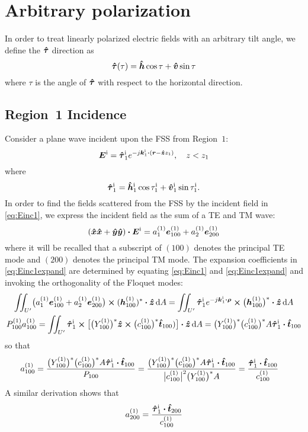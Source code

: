 \documentclass[11pt]{article}
\renewcommand{\inc}{^{\text{i}}}
\renewcommand{\abs}[1]{\bigl\lvert#1\bigr\rvert}
\begin{document}
\section{Arbitrary polarization}
In order to treat linearly polarized electric fields with an arbitrary
tilt angle, we define the $\tauhat$ direction as 
\begin{equation}
  \tauhat(\tau) = \hhat \cos \tau + \vhat \sin \tau
\end{equation}
where $\tau$ is the angle of $\tauhat$ with respect to the horizontal
direction. 

\subsection{Region~1 Incidence}

Consider a plane wave incident upon the FSS from Region~$1$:
\begin{equation}
  \E\inc = \tauhat_1\inc e^{-j\k_1\inc \bdot (\r - \z z_1)}, \quad z<z_1
  \label{eq:Einc1}
\end{equation}
where
\begin{equation}
  \tauhat_1\inc = \hhat_1\inc \cos \tau_1\inc + \vhat_1\inc \sin \tau_1\inc.
\end{equation}
In order to find the fields scattered from the FSS by the incident
field in \eqref{eq:Einc1}, we express the incident field as the sum of
a TE and TM wave:
\begin{equation}
  (\x\x+\y\y) \bdot \E\inc = a_1\one \e\one_{100} + a_2\one \e\one_{200}
  \label{eq:Einc1expand}
\end{equation}
where it will be recalled that a subscript of $(100)$ denotes the
principal TE mode and $(200)$ denotes the principal TM mode.
The expansion coefficients in \eqref{eq:Einc1expand} are determined
by equating \eqref{eq:Einc1} and \eqref{eq:Einc1expand} and
invoking the orthogonality of the Floquet modes: 
\begin{gather}
  \iint_{U'} \bigl(a_1\one \e\one_{100} + a_2\one \e\one_{200}\bigr) \cross
  (\h\one_{100})^* \bdot \z \, \d A 
  =
  \iint_{U'} \tauhat_1\inc e^{-j\k_1\inc \bdot \vecrho} \cross
  \bigl(\h\one_{100}\bigr)^* \bdot \z \, \d A \nonumber \\
  P\one_{100} a\one_{100} =
  \iint_{U'} \tauhat_1\inc \cross 
  \bigl[
    \bigl(Y\one_{100}\bigr)^* 
    \z \cross \bigl(c\one_{100}\bigr)^* \t_{100})
  \bigr] \bdot \z \, \d A 
  =\bigl(Y\one_{100}\bigr)^* \bigl(c\one_{100}\bigr)^* A
  \tauhat_1\inc \bdot \t_{100}
\end{gather}
so that 
\begin{align}
  a\one_{100} &= \frac{\bigl(Y\one_{100}\bigr)^* %
    \bigl(c\one_{100}\bigr)^* A   \tauhat_1\inc \bdot \t_{100}}%
  {P_{100}}
  = 
  \frac{\bigl(Y\one_{100}\bigr)^* %
    \bigl(c\one_{100}\bigr)^* A   \tauhat_1\inc \bdot \t_{100}}%
  {\abs{c\one_{100}}^2 \bigl(Y\one_{100}\bigr)^* A} 
  = \frac{\tauhat_1\inc \bdot \t_{100}}{c\one_{100}}
\end{align}
A similar derivation shows that
\begin{equation}
  a\one_{200} = \frac{\tauhat_1\inc \bdot \t_{200}}{c\one_{100}}
\end{equation}
\end{document}

